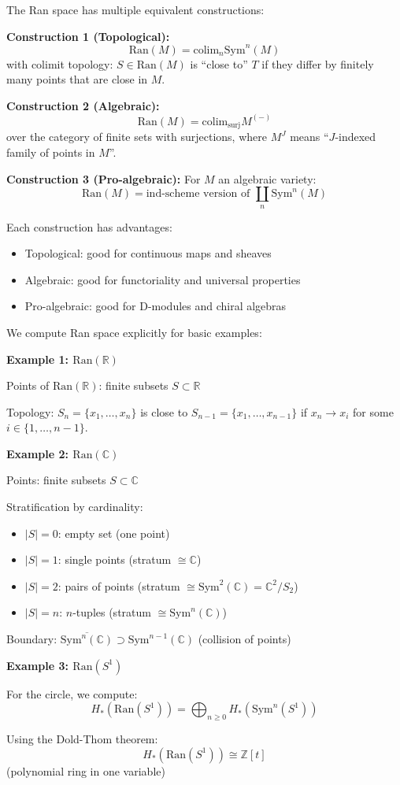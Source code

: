 \begin{construction}
The Ran space has multiple equivalent constructions:

\textbf{Construction 1 (Topological):}
$$\text{Ran}(M) = \text{colim}_{n} \text{Sym}^n(M)$$
with colimit topology: $S \in \text{Ran}(M)$ is ``close to'' $T$ if they differ by 
finitely many points that are close in $M$.

\textbf{Construction 2 (Algebraic):}
$$\text{Ran}(M) = \text{colim}_{\text{surj}} M^{(-)}$$
over the category of finite sets with surjections, where $M^J$ means ``$J$-indexed 
family of points in $M$''.

\textbf{Construction 3 (Pro-algebraic):}
For $M$ an algebraic variety:
$$\text{Ran}(M) = \text{ind-scheme version of } \coprod_{n} \text{Sym}^n(M)$$

Each construction has advantages:
\begin{itemize}
\item Topological: good for continuous maps and sheaves
\item Algebraic: good for functoriality and universal properties
\item Pro-algebraic: good for D-modules and chiral algebras
\end{itemize}
\end{construction}

\begin{computation}
We compute Ran space explicitly for basic examples:

\textbf{Example 1: $\text{Ran}(\mathbb{R})$}

Points of $\text{Ran}(\mathbb{R})$: finite subsets $S \subset \mathbb{R}$

Topology: $S_n = \{x_1, \ldots, x_n\}$ is close to $S_{n-1} = \{x_1, \ldots, x_{n-1}\}$ 
if $x_n \to x_i$ for some $i \in \{1, \ldots, n-1\}$.

\textbf{Example 2: $\text{Ran}(\mathbb{C})$}

Points: finite subsets $S \subset \mathbb{C}$

Stratification by cardinality:
\begin{itemize}
\item $|S| = 0$: empty set (one point)
\item $|S| = 1$: single points (stratum $\cong \mathbb{C}$)
\item $|S| = 2$: pairs of points (stratum $\cong \text{Sym}^2(\mathbb{C}) = \mathbb{C}^2/S_2$)
\item $|S| = n$: $n$-tuples (stratum $\cong \text{Sym}^n(\mathbb{C})$)
\end{itemize}

Boundary: $\overline{\text{Sym}^n(\mathbb{C})} \supset \text{Sym}^{n-1}(\mathbb{C})$ 
(collision of points)

\textbf{Example 3: $\text{Ran}(S^1)$}

For the circle, we compute:
$$H_*(\text{Ran}(S^1)) = \bigoplus_{n \geq 0} H_*(\text{Sym}^n(S^1))$$

Using the Dold-Thom theorem:
$$H_*(\text{Ran}(S^1)) \cong \mathbb{Z}[t]$$
(polynomial ring in one variable)
\end{computation}

